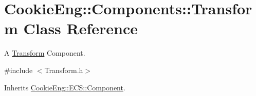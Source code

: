 \hypertarget{class_cookie_eng_1_1_components_1_1_transform}{}\section{Cookie\+Eng\+:\+:Components\+:\+:Transform Class Reference}
\label{class_cookie_eng_1_1_components_1_1_transform}


A \hyperlink{class_cookie_eng_1_1_components_1_1_transform}{Transform} Component.  




{\ttfamily \#include $<$Transform.\+h$>$}



Inherits \hyperlink{class_cookie_eng_1_1_e_c_s_1_1_component}{Cookie\+Eng\+::\+E\+C\+S\+::\+Component}.


